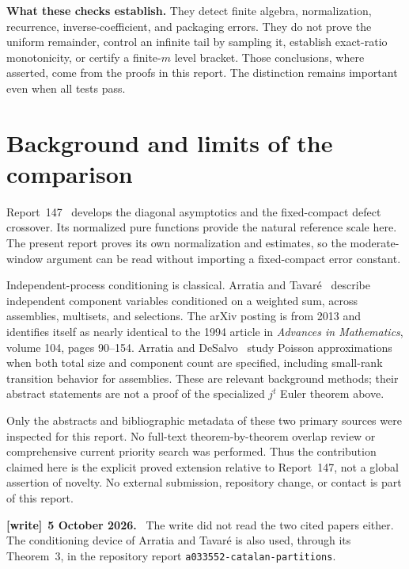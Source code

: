 \documentclass[11pt,letterpaper]{article}
\numberwithin{equation}{section}
\theoremstyle{definition}\newtheorem{definition}[theorem]{Definition}
\theoremstyle{remark}\newtheorem{remark}[theorem]{Remark}
\newcommand{\file}[1]{\nolinkurl{#1}}
\newenvironment{writenote}[1][]{\par\smallskip\begingroup\small
 \noindent\textbf{[write]}\if\relax\detokenize{#1}\relax\else~\textbf{#1.}\fi\ }%
 {\par\endgroup\smallskip}
\begin{document}
\textbf{What these checks establish.} They detect finite algebra,
normalization, recurrence, inverse-coefficient, and packaging errors.
They do not prove the uniform remainder, control an infinite tail by
sampling it, establish exact-ratio monotonicity, or certify a finite-$m$
level bracket. Those conclusions, where asserted, come from the
proofs in this report. The distinction remains important even when
all tests pass.

\section{Background and limits of the comparison}\label{det:grow:sec:background}
Report~147~\cite{foundation} develops the diagonal asymptotics and the
fixed-compact defect crossover. Its normalized pure functions provide
the natural reference scale here. The present report proves its own
normalization and estimates, so the moderate-window argument can be
read without importing a fixed-compact error constant.

Independent-process conditioning is classical. Arratia and
Tavar\'e~\cite{arratia-tavare} describe independent component variables
conditioned on a weighted sum, across assemblies, multisets, and
selections. The arXiv posting is from 2013 and identifies itself as
nearly identical to the 1994 article in \emph{Advances in Mathematics},
volume 104, pages 90--154. Arratia and DeSalvo~\cite{arratia-desalvo}
study Poisson approximations when both total size and component count
are specified, including small-rank transition behavior for assemblies.
These are relevant background methods; their abstract statements are
not a proof of the specialized $j^t$ Euler theorem above.

Only the abstracts and bibliographic metadata of these two primary
sources were inspected for this report. No full-text theorem-by-theorem
overlap review or comprehensive current priority search was performed.
Thus the contribution claimed here is the explicit proved extension
relative to Report~147, not a global assertion of novelty. No external
submission, repository change, or contact is part of this report.
\begin{writenote}[5 October 2026]
The write did not read the two cited papers either. The conditioning device of Arratia and Tavar\'e is also used, through its Theorem~3, in the repository report \file{a033552-catalan-partitions}.
\end{writenote}
\end{document}
